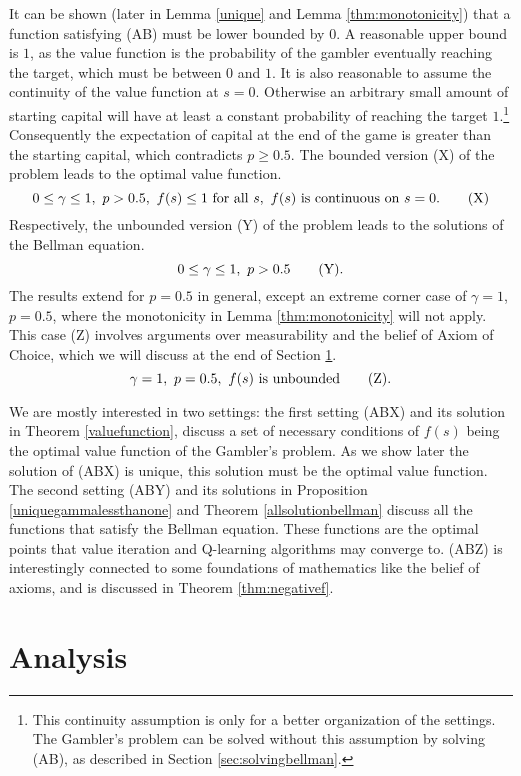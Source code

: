 \documentclass{article}
\theoremstyle{named}
\begin{document}
It can be shown (later in Lemma \ref{unique} and Lemma \ref{thm:monotonicity}) that a function satisfying (AB) must be lower bounded by $0$. A reasonable upper bound is $1$, as the value function is the probability of the gambler eventually reaching the target, which must be between $0$ and $1$. It is also reasonable to assume the continuity of the value function at $s=0$. Otherwise an arbitrary small amount of starting capital will have at least a constant probability of reaching the target $1$.\footnote{This continuity assumption is only for a better organization of the settings. The Gambler's problem can be solved without this assumption by solving (AB), as described in Section \ref{sec:solvingbellman}.} Consequently the expectation of capital at the end of the game is greater than the starting capital, which contradicts $p\geq 0.5$. The bounded version (X) of the problem leads to the optimal value function.
\[
0\leq\gamma\leq 1,\ p>0.5,\ f(s)\leq 1\ \text{for all}\ s,\ f(s) \ \text{is continuous on} \ s=0. \tag{{X}}
\]
Respectively, the unbounded version (Y) of the problem leads to the solutions of the Bellman equation.
\[
0\leq\gamma\leq 1,\ p>0.5 \tag{{Y}}.
\]
The results extend for $p=0.5$ in general, except an extreme corner case of $\gamma=1$, $p=0.5$, where the monotonicity in Lemma \ref{thm:monotonicity} will not apply. This case ({Z}) involves arguments over measurability and the belief of Axiom of Choice, which we will discuss at the end of Section \ref{sec:analysis}.
\[
\gamma=1,\ p=0.5,\ f(s) \ \text{is unbounded} \tag{{Z}}.
\]

We are mostly interested in two settings: the first setting ({ABX}) and its solution in Theorem \ref{valuefunction}, discuss a set of necessary conditions of $f(s)$ being the optimal value function of the Gambler's problem. As we show later the solution of ({ABX}) is unique, this solution must be the optimal value function. The second setting ({ABY}) and its solutions in Proposition \ref{uniquegammalessthanone} and Theorem \ref{allsolutionbellman} discuss all the functions that satisfy the Bellman equation. These functions are the optimal points that value iteration and Q-learning algorithms may converge to. ({ABZ}) is interestingly connected to some foundations of mathematics like the belief of axioms, and is discussed in Theorem \ref{thm:negativef}.

\section{Analysis}
\label{sec:analysis}
\end{document}
